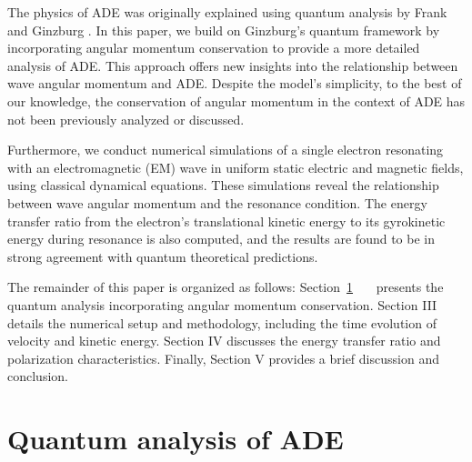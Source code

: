 \documentclass{cpbtex3}
\begin{document}
The physics of ADE was originally explained using quantum analysis by Frank and Ginzburg \cite{frank1960optics,ginzburg1979nonlinear}. In this paper, we build on Ginzburg’s quantum framework by incorporating angular momentum conservation to provide a more detailed analysis of ADE. This approach offers new insights into the relationship between wave angular momentum and ADE. Despite the model's simplicity, to the best of our knowledge, the conservation of angular momentum in the context of ADE has not been previously analyzed or discussed.

Furthermore, we conduct numerical simulations of a single electron resonating with an electromagnetic (EM) wave in uniform static electric and magnetic fields, using classical dynamical equations. These simulations reveal the relationship between wave angular momentum and the resonance condition. The energy transfer ratio from the electron’s translational kinetic energy to its gyrokinetic energy during resonance is also computed, and the results are found to be in strong agreement with quantum theoretical predictions.

The remainder of this paper is organized as follows: Section~\ref{Quantum}~~~ presents the quantum analysis incorporating angular momentum conservation. Section III details the numerical setup and methodology, including the time evolution of velocity and kinetic energy. Section IV discusses the energy transfer ratio and polarization characteristics. Finally, Section V provides a brief discussion and conclusion.

\section{Quantum analysis of ADE}\label{Quantum}
\end{document}
